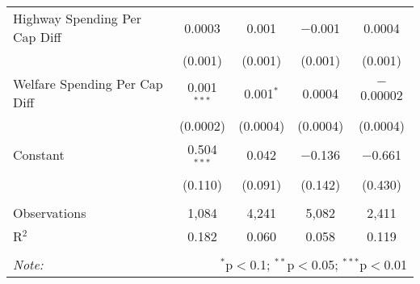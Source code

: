 \begin{table}[!htbp]
\begin{tabular}{@{\extracolsep{5pt}}lcccc}
  Highway Spending Per Cap Diff & 0.0003 & 0.001 & $-$0.001 & 0.0004 \\ 
  & (0.001) & (0.001) & (0.001) & (0.001) \\ 
  Welfare Spending Per Cap Diff & 0.001$^{***}$ & 0.001$^{*}$ & 0.0004 & $-$0.00002 \\ 
  & (0.0002) & (0.0004) & (0.0004) & (0.0004) \\ 
  Constant & 0.504$^{***}$ & 0.042 & $-$0.136 & $-$0.661 \\ 
  & (0.110) & (0.091) & (0.142) & (0.430) \\ 
 \hline \\[-1.8ex] 
Observations & 1,084 & 4,241 & 5,082 & 2,411 \\ 
R$^{2}$ & 0.182 & 0.060 & 0.058 & 0.119 \\ 
\hline 
\hline \\[-1.8ex] 
\textit{Note:}  & \multicolumn{4}{r}{$^{*}$p$<$0.1; $^{**}$p$<$0.05; $^{***}$p$<$0.01} \\ 
\end{tabular} 
\end{table} 
